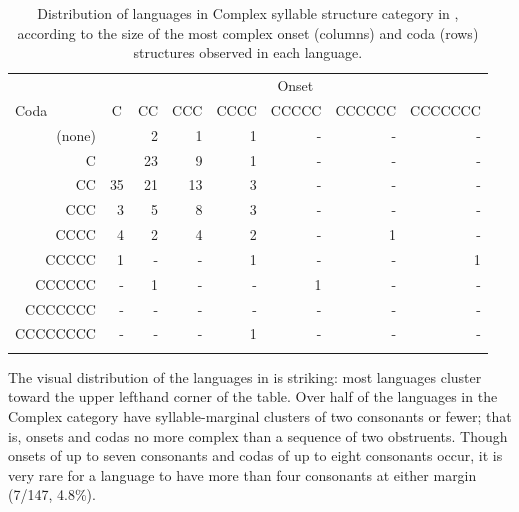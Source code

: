 \begin{table}
\begin{tabular}{*{8}{r}}
\lsptoprule
                 & \multicolumn{7}{c}{Onset}\\\cmidrule(lr){2-8}
 \multicolumn{1}{l}{Coda}     & \multicolumn{1}{c}{C} & \multicolumn{1}{c}{CC} & \multicolumn{1}{c}{CCC} & \multicolumn{1}{c}{CCCC} & \multicolumn{1}{c}{CCCCC} & \multicolumn{1}{c}{CCCCCC} & \multicolumn{1}{c}{CCCCCCC}\\\midrule
 {(none)}   & \cellcolor{lsLightGray} & 2 & 1 & 1 & - & - & -\\
 {C}        & \cellcolor{lsLightGray} & 23 & 9 & 1 & - & - & -\\
 {CC}       & 35 & 21 & 13 & 3 & - & - & -\\
 {CCC}      & 3 & 5 & 8 & 3 & - & - & -\\
 {CCCC}     & 4 & 2 & 4 & 2 & - & 1 & -\\
 {CCCCC}    & 1 & - & - & 1 & - & - & 1\\
 {CCCCCC}   & - & 1 & - & - & 1 & - & -\\
 {CCCCCCC}  & - & - & - & - & - & - & -\\
 {CCCCCCCC} & - & - & - & 1 & - & - & -\\
\lspbottomrule
\end{tabular}
\caption{\label{tab:2.2}Distribution of languages in Complex syllable structure category in \citet{Maddieson2013a}, according to the size of the most complex onset (columns) and coda (rows) structures observed in each language.}
\end{table}

  The visual distribution of the languages in  is striking: most languages cluster toward the upper lefthand corner of the table. Over half of the languages in the Complex category have syllable-marginal clusters of two consonants or fewer; that is, onsets and codas no more complex than a sequence of two obstruents. Though onsets of up to seven consonants and codas of up to eight consonants occur, it is very rare for a language to have more than four consonants at either margin (7/147, 4.8\%).

